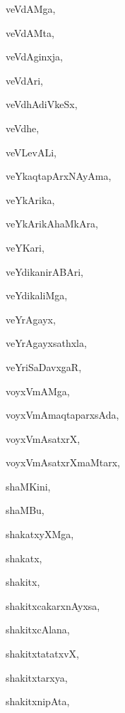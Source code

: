\begin{multicols}{3}
{\noindent
{veVdAMga}, \pageref{veVdAMga}

\noindent
{veVdAMta}, \pageref{veVdAMta}

\noindent
{veVdAginxja}, \pageref{veVdAginxja}

\noindent
{veVdAri}, \pageref{veVdAri}

\noindent
{veVdhAdiVkeSx}, \pageref{veVdhAdiVkeSx}

\noindent
{veVdhe}, \pageref{veVdhe}

\noindent
{veVLevALi}, \pageref{veVLevALi}

\noindent
{veYkaqtapArxNAyAma}, \pageref{veYkaqtapArxNAyAma}

\noindent
{veYkArika}, \pageref{veYkArika}

\noindent
{veYkArikAhaMkAra}, \pageref{veYkArikAhaMkAra}

\noindent
{veYKari}, \pageref{veYKari}

\noindent
{veYdikanirABAri}, \pageref{veYdikanirABAri}

\noindent
{veYdikaliMga}, \pageref{veYdikaliMga}

\noindent
{veYrAgayx}, \pageref{veYrAgayx}

\noindent
{veYrAgayxsathxla}, \pageref{veYrAgayxsathxla}

\noindent
{veYriSaDavxgaR}, \pageref{veYriSaDavxgaR}

\noindent
{voyxVmAMga}, \pageref{voyxVmAMga}

\noindent
{voyxVmAmaqtaparxsAda}, \pageref{voyxVmAmaqtaparxsAda}

\noindent
{voyxVmAsatxrX}, \pageref{voyxVmAsatxrX}

\noindent
{voyxVmAsatxrXmaMtarx}, \pageref{voyxVmAsatxrXmaMtarx}

\noindent
{shaMKini}, \pageref{shaMKini}

\noindent
{shaMBu}, \pageref{shaMBu}

\noindent
{shakatxyXMga}, \pageref{shakatxyXMga}

\noindent
{shakatx}, \pageref{shakatx}

\noindent
{shakitx}, \pageref{shakitx}

\noindent
{shakitxcakarxnAyxsa}, \pageref{shakitxcakarxnAyxsa}

\noindent
{shakitxcAlana}, \pageref{shakitxcAlana}

\noindent
{shakitxtatatxvX}, \pageref{shakitxtatatxvX}

\noindent
{shakitxtarxya}, \pageref{shakitxtarxya}

\noindent
{shakitxnipAta}, \pageref{shakitxnipAta}

}
\end{multicols}
